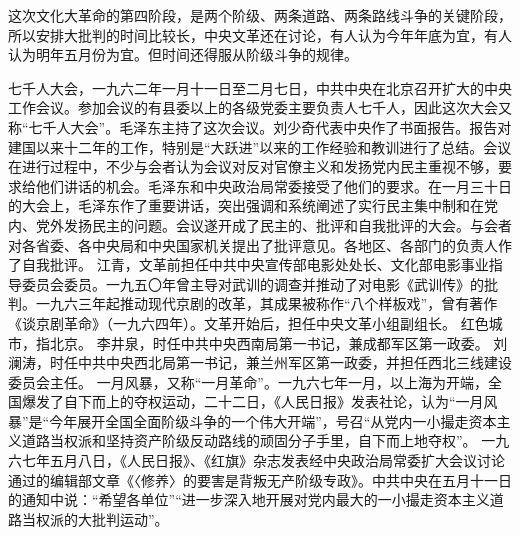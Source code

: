 这次文化大革命的第四阶段，是两个阶级、两条道路、两条路线斗争的关键阶段，所以安排大批判的时间比较长，中央文革还在讨论，有人认为今年年底为宜，有人认为明年五月份为宜。但时间还得服从阶级斗争的规律。

\begin{maonote}
七千人大会，一九六二年一月十一日至二月七日，中共中央在北京召开扩大的中央工作会议。参加会议的有县委以上的各级党委主要负责人七千人，因此这次大会又称“七千人大会”。毛泽东主持了这次会议。刘少奇代表中央作了书面报告。报告对建国以来十二年的工作，特别是“大跃进”以来的工作经验和教训进行了总结。会议在进行过程中，不少与会者认为会议对反对官僚主义和发扬党内民主重视不够，要求给他们讲话的机会。毛泽东和中央政治局常委接受了他们的要求。在一月三十日的大会上，毛泽东作了重要讲话，突出强调和系统阐述了实行民主集中制和在党内、党外发扬民主的问题。会议遂开成了民主的、批评和自我批评的大会。与会者对各省委、各中央局和中央国家机关提出了批评意见。各地区、各部门的负责人作了自我批评。
江青，文革前担任中共中央宣传部电影处处长、文化部电影事业指导委员会委员。一九五〇年曾主导对武训的调查并推动了对电影《武训传》的批判。一九六三年起推动现代京剧的改革，其成果被称作“八个样板戏”，曾有著作《谈京剧革命》（一九六四年）。文革开始后，担任中央文革小组副组长。
红色城市，指北京。
李井泉，时任中共中央西南局第一书记，兼成都军区第一政委。
刘澜涛，时任中共中央西北局第一书记，兼兰州军区第一政委，并担任西北三线建设委员会主任。
一月风暴，又称“一月革命”。一九六七年一月，以上海为开端，全国爆发了自下而上的夺权运动，二十二日，《人民日报》发表社论，认为“一月风暴”是“今年展开全国全面阶级斗争的一个伟大开端”，号召“从党内一小撮走资本主义道路当权派和坚持资产阶级反动路线的顽固分子手里，自下而上地夺权”。
一九六七年五月八日，《人民日报》、《红旗》杂志发表经中央政治局常委扩大会议讨论通过的编辑部文章《〈修养〉的要害是背叛无产阶级专政》。中共中央在五月十一日的通知中说：“希望各单位”“进一步深入地开展对党内最大的一小撮走资本主义道路当权派的大批判运动”。
\end{maonote}

